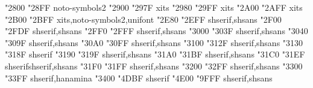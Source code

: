\documentclass{article}
\begin{document}
                               {  "2800} {  "28FF} {noto-symbols2}
                          {  "2900} {  "297F} {xits}
           {  "2980} {  "29FF} {xits}
            {  "2A00} {  "2AFF} {xits}
               {  "2B00} {  "2BFF} {xits,noto-symbols2,unifont}
                        {  "2E80} {  "2EFF} {shserif,shsans}
                                {  "2F00} {  "2FDF} {shserif,shsans}
             {  "2FF0} {  "2FFF} {shserif,shsans}
                    {  "3000} {  "303F} {shserif,shsans}
                                       {  "3040} {  "309F} {shserif,shsans}
                                       {  "30A0} {  "30FF} {shserif,shsans}
                                       {  "3100} {  "312F} {shserif,shsans}
                      {  "3130} {  "318F} {shserif}
                                         {  "3190} {  "319F} {shserif,shsans}
                              {  "31A0} {  "31BF} {shserif,shsans}
                                    {  "31C0} {  "31EF} {shserifshserif,shsans}
                   {  "31F0} {  "31FF} {shserif,shsans}
                {  "3200} {  "32FF} {shserif,shsans}
                              {  "3300} {  "33FF} {shserif,hanamina}
             {  "3400} {  "4DBF} {shserif}
                         {  "4E00} {  "9FFF} {shserif,shsans}
\end{document}
